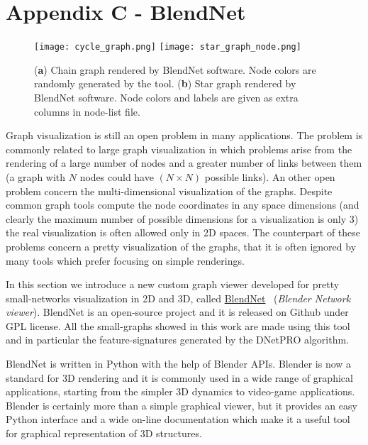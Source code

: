 \documentclass{standalone}
\begin{document}
\chapter*{Appendix C - BlendNet}

\begin{figure}[htbp]
\centering
\texttt{[image: cycle\_graph.png]}
\qquad\qquad
\texttt{[image: star\_graph\_node.png]}
\caption{(\textbf{a}) Chain graph rendered by \textsf{BlendNet} software.
Node colors are randomly generated by the tool.
(\textbf{b}) Star graph rendered by \textsf{BlendNet} software.
Node colors and labels are given as extra columns in node-list file.
}
\label{fig:blendnet}
\end{figure}

Graph visualization is still an open problem in many applications.
The problem is commonly related to large graph visualization in which problems arise from the rendering of a large number of nodes and a greater number of links between them (a graph with $N$ nodes could have $(N \times N)$ possible links).
An other open problem concern the multi-dimensional visualization of the graphs.
Despite common graph tools compute the node coordinates in any space dimensions (and clearly the maximum number of possible dimensions for a visualization is only 3) the real visualization is often allowed only in 2D spaces.
The counterpart of these problems concern a pretty visualization of the graphs, that it is often ignored by many tools which prefer focusing on simple renderings.

In this section we introduce a new custom graph viewer developed for pretty small-networks visualization in 2D and 3D, called \href{https://github.com/Nico-Curti/BlendNet}{\textsf{BlendNet}}~\cite{BlendNet} (\emph{Blender Network viewer}).
\textsf{BlendNet} is an open-source project and it is released on Github under GPL license.
All the small-graphs showed in this work are made using this tool and in particular the feature-signatures generated by the \textsf{DNetPRO} algorithm.

\textsf{BlendNet} is written in \textsf{Python} with the help of \textsf{Blender} APIs.
\textsf{Blender} is now a standard for 3D rendering and it is commonly used in a wide range of graphical applications, starting from the simpler 3D dynamics to video-game applications.
\textsf{Blender} is certainly more than a simple graphical viewer, but it provides an easy \textsf{Python} interface and a wide on-line documentation which make it a useful tool for graphical representation of 3D structures.
\end{document}
